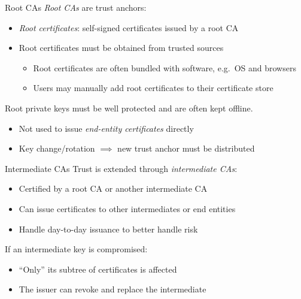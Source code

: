 \begin{frame}{Root CAs}
  \emph{Root CAs} are trust anchors:
  \begin{itemize}[<+(1)->]
    \item \emph{Root certificates}: self-signed certificates issued by a root CA
    \item Root certificates must be obtained from trusted sources
    \par
    \begin{itemize}
      \item Root certificates are often bundled with software, e.g.\ OS and browsers
      \item Users may manually add root certificates to their certificate store
    \end{itemize}
  \end{itemize}

  \vspace*{1em}

  \pause
  Root private keys must be well protected and are often kept offline.
  \begin{itemize}[<+(1)->]
    \item Not used to issue \emph{end-entity certificates} directly
    \item Key change/rotation $\implies$ new trust anchor must be distributed
  \end{itemize}
\end{frame}

\begin{frame}{Intermediate CAs}
    Trust is extended through \emph{intermediate CAs}:
    \begin{itemize}[<+(1)->]
      \item Certified by a root CA or another intermediate CA
      \item Can issue certificates to other intermediates or end entities
      \item Handle day-to-day issuance to better handle risk
    \end{itemize}

    \vspace*{1em}

    \pause
    If an intermediate key is compromised:
    \begin{itemize}[<+(1)->]
      \item \enquote{Only} its subtree of certificates is affected
      \item The issuer can revoke and replace the intermediate
    \end{itemize}
\end{frame}

